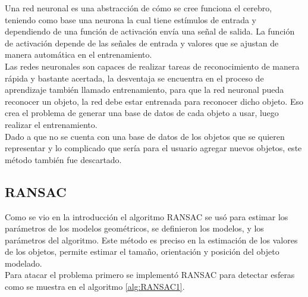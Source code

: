         Una red neuronal es una abstracción de cómo se cree funciona el cerebro, teniendo como base una neurona la cual tiene estímulos de entrada y dependiendo de una función de activación envía una señal de salida. La función de activación depende de las señales de entrada y valores que se ajustan de manera automática en el entrenamiento.\\
        
        Las redes neuronales son capaces de realizar tareas de reconocimiento de manera rápida y bastante acertada, la desventaja se encuentra en el proceso de aprendizaje también llamado entrenamiento, para que la red neuronal pueda reconocer un objeto, la red debe estar entrenada para reconocer dicho objeto. Eso crea el problema de generar una base de datos de cada objeto a usar, luego realizar el entrenamiento.\\
        
        Dado a que no se cuenta con una base de datos de los objetos que se quieren representar y lo complicado que sería para el usuario agregar nuevos objetos, este método también fue descartado.
        
        
        
        
    
    
    \subsection{RANSAC}
        Como se vio en la introducción el algoritmo RANSAC se usó para estimar los parámetros de los modelos geométricos, se definieron los modelos, y los parámetros del algoritmo. Este método es preciso en la estimación de los valores de los objetos, permite estimar el tamaño, orientación y posición del objeto modelado.  \\ 
        
                
        Para atacar el problema primero se implementó RANSAC para detectar esferas como se muestra en el \gls{algoritmo} \ref{alg:RANSAC1}.\\
               
